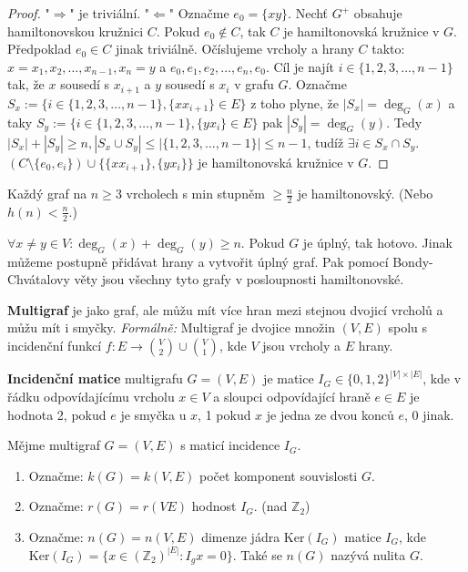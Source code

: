 \begin{proof}
	"$\Rightarrow$" je triviální. "$\Leftarrow$" Označme $e_{0} = \{xy\}$. Nechť $G^{+}$ obsahuje hamiltonovskou kružnici $C$. Pokud $e_{0} \notin C$, tak $C$ je hamiltonovská kružnice v $G$. Předpoklad $e_{0} \in C$ jinak triviálně. Očíslujeme vrcholy a hrany $C$ takto: $x = x_{1}, x_{2}, \dots, x_{n-1}, x_{n} = y$ a $e_{0}, e_{1}, e_{2}, \dots , e_{n}, e_{0}$. Cíl je najít $i \in \{1,2,3, \dots, n-1\}$ tak, že $x$ sousedí s $x_{i+1}$ a $y$ sousedí s $x_{i}$ v grafu $G$. Označme $S_{x} := \{i \in \{1,2,3,\dots,n-1\}, \{xx_{i+1}\} \in E\}$ z toho plyne, že $|S_{x}| = \deg_{G}(x)$ a taky $S_{y} := \{i \in \{1,2,3,\dots,n-1\}, \{yx_{i}\} \in E\}$ pak $|S_{y}| = \deg_{G}(y)$. Tedy $|S_{x}| + |S_{y}| \geq n, |S_{x} \cup S_{y}| \leq |\{1,2,3, \dots, n-1\}| \leq n-1$, tudíž $\exists i \in S_{x} \cap S_{y}$. $(C \setminus \{e_{0},e_{i}\}) \cup \{\{xx_{i+1}\},\{yx_{i}\}\}$ je hamiltonovská kružnice v $G$.
\end{proof}

\begin{dusl}[Dirac]
	Každý graf na $n \geq 3$ vrcholech s min stupněm $\geq \frac{n}{2}$ je hamiltonovský. (Nebo $h(n) < \frac{n}{2}$.)
\end{dusl}

\begin{dusl}
	$\forall x \neq y \in V: \deg_{G}(x) + \deg_{G}(y) \geq n$. Pokud $G$ je úplný, tak hotovo. Jinak můžeme postupně přidávat hrany a vytvořit úplný graf. Pak pomocí Bondy-Chvátalovy věty jsou všechny tyto grafy v posloupnosti hamiltonovské.
\end{dusl}

\begin{definice}
	\textbf{Multigraf} je jako graf, ale můžu mít více hran mezi stejnou dvojicí vrcholů a můžu mít i smyčky. \textit{Formálně:} Multigraf je dvojice množin $(V,E)$ spolu s incidenční funkcí $f: E \to \binom{V}{2} \cup \binom{V}{1}$, kde $V$ jsou vrcholy a $E$ hrany.
\end{definice}

\begin{definice}
	\textbf{Incidenční matice} multigrafu $G = (V,E)$ je matice $I_{G} \in \{0,1,2\}^{|V| \times |E|}$, kde v řádku odpovídajícímu vrcholu $x \in V$ a sloupci odpovídající hraně $e \in E$ je hodnota 2, pokud $e$ je smyčka u $x$, 1 pokud $x$ je jedna ze dvou konců $e$, 0 jinak.
\end{definice}

\begin{definice}
	Mějme multigraf $G = (V,E)$ s maticí incidence $I_{G}$.
	
	\begin{enumerate}
		\item Označme: $k(G) = k(V,E)$ počet komponent souvislosti $G$.
		\item Označme: $r(G) = r(VE)$ hodnost $I_{G}$. (nad $\mathbb{Z}_{2}$)
		\item Označme: $n(G) = n(V,E)$ dimenze jádra $\text{Ker}(I_{G})$ matice $I_{G}$, kde $\text{Ker}(I_{G}) = \{x \in (\mathbb{Z}_{2})^{|E|}: I_{g}x = 0\}$. Také se $n(G)$ nazývá nulita $G$.
	\end{enumerate}
\end{definice}

